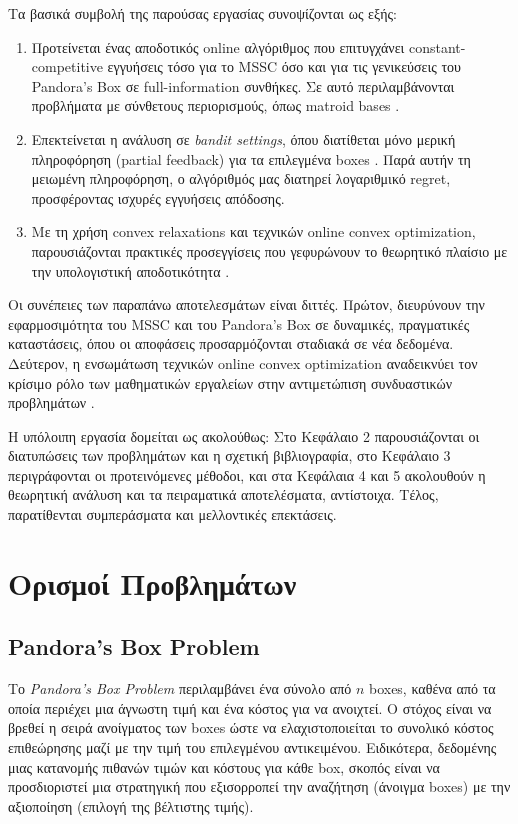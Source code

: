 \documentclass[11pt,a4paper]{article}
\begin{document}
Τα βασικά συμβολή της παρούσας εργασίας συνοψίζονται ως εξής:
\begin{enumerate}
    \item Προτείνεται ένας αποδοτικός online αλγόριθμος που επιτυγχάνει constant-competitive εγγυήσεις τόσο για το MSSC όσο και για τις γενικεύσεις του Pandora's Box σε full-information συνθήκες. Σε αυτό περιλαμβάνονται προβλήματα με σύνθετους περιορισμούς, όπως matroid bases \cite{bansal2010constant}.
    \item Επεκτείνεται η ανάλυση σε \textit{bandit settings}, όπου διατίθεται μόνο μερική πληροφόρηση (partial feedback) για τα επιλεγμένα boxes \cite{flaxman2004online}. Παρά αυτήν τη μειωμένη πληροφόρηση, ο αλγόριθμός μας διατηρεί λογαριθμικό regret, προσφέροντας ισχυρές εγγυήσεις απόδοσης.
    \item Με τη χρήση convex relaxations και τεχνικών online convex optimization, παρουσιάζονται πρακτικές προσεγγίσεις που γεφυρώνουν το θεωρητικό πλαίσιο με την υπολογιστική αποδοτικότητα \cite{shalev2007primal}.
\end{enumerate}

Οι συνέπειες των παραπάνω αποτελεσμάτων είναι διττές. Πρώτον, διευρύνουν την εφαρμοσιμότητα του MSSC και του Pandora's Box σε δυναμικές, πραγματικές καταστάσεις, όπου οι αποφάσεις προσαρμόζονται σταδιακά σε νέα δεδομένα. Δεύτερον, η ενσωμάτωση τεχνικών online convex optimization αναδεικνύει τον κρίσιμο ρόλο των μαθηματικών εργαλείων στην αντιμετώπιση συνδυαστικών προβλημάτων \cite{gergatsouli2022online}.

Η υπόλοιπη εργασία δομείται ως ακολούθως: Στο Κεφάλαιο 2 παρουσιάζονται οι διατυπώσεις των προβλημάτων και η σχετική βιβλιογραφία, στο Κεφάλαιο 3 περιγράφονται οι προτεινόμενες μέθοδοι, και στα Κεφάλαια 4 και 5 ακολουθούν η θεωρητική ανάλυση και τα πειραματικά αποτελέσματα, αντίστοιχα. Τέλος, παρατίθενται συμπεράσματα και μελλοντικές επεκτάσεις.

\section{Ορισμοί Προβλημάτων}
\subsection{Pandora’s Box Problem}
Το \textit{Pandora’s Box Problem} περιλαμβάνει ένα σύνολο από \( n \) boxes, καθένα από τα οποία περιέχει μια άγνωστη τιμή και ένα κόστος για να ανοιχτεί. Ο στόχος είναι να βρεθεί η σειρά ανοίγματος των boxes ώστε να ελαχιστοποιείται το συνολικό κόστος επιθεώρησης μαζί με την τιμή του επιλεγμένου αντικειμένου. Ειδικότερα, δεδομένης μιας κατανομής πιθανών τιμών και κόστους για κάθε box, σκοπός είναι να προσδιοριστεί μια στρατηγική που εξισορροπεί την αναζήτηση (άνοιγμα boxes) με την αξιοποίηση (επιλογή της βέλτιστης τιμής).
\end{document}
